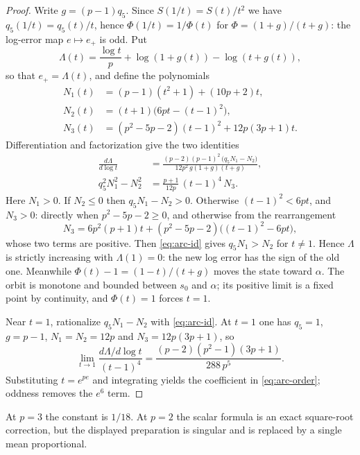 \documentclass[10pt,a4paper]{article}
\theoremstyle{plain}
\theoremstyle{remark}
\numberwithin{equation}{section}
\begin{document}
\begin{proof}
Write $g=(p-1)q_5$. Since $S(1/t)=S(t)/t^{2}$ we have $q_5(1/t)=q_5(t)/t$, hence
$\Phi(1/t)=1/\Phi(t)$ for $\Phi=(1+g)/(t+g)$: the log-error map $e\mapsto e_+$ is odd. Put
\[ \Lambda(t)=\frac{\log t}{p}+\log(1+g(t))-\log(t+g(t)), \]
so that $e_+=\Lambda(t)$, and define the polynomials
\begin{align*}
N_1(t)&=(p-1)(t^{2}+1)+(10p+2)t,\\
N_2(t)&=(t+1)\bigl(6pt-(t-1)^{2}\bigr),\\
N_3(t)&=(p^{2}-5p-2)(t-1)^{2}+12p(3p+1)t .
\end{align*}
Differentiation and factorization give the two identities
\begin{align}
\frac{d\Lambda}{d\log t}&=\frac{(p-2)(p-1)^{2}\,\bigl(q_5N_1-N_2\bigr)}{12p^{2}\,g(1+g)(t+g)},\label{eq:arc-der}\\
q_5^{2}N_1^{2}-N_2^{2}&=\frac{p+1}{12p}\,(t-1)^{4}\,N_3 .\label{eq:arc-id}
\end{align}
Here $N_1>0$. If $N_2\le0$ then $q_5N_1-N_2>0$. Otherwise $(t-1)^{2}<6pt$, and $N_3>0$: directly when
$p^{2}-5p-2\ge0$, and otherwise from the rearrangement
\[ N_3=6p^{2}(p+1)t+(p^{2}-5p-2)\bigl((t-1)^{2}-6pt\bigr), \]
whose two terms are positive. Then \eqref{eq:arc-id} gives $q_5N_1>N_2$ for $t\neq1$. Hence $\Lambda$
is strictly increasing with $\Lambda(1)=0$: the new log error has the sign of the old one. Meanwhile
$\Phi(t)-1=(1-t)/(t+g)$ moves the state toward $\alpha$. The orbit is monotone and bounded between
$s_0$ and $\alpha$; its positive limit is a fixed point by continuity, and $\Phi(t)=1$ forces $t=1$.

Near $t=1$, rationalize $q_5N_1-N_2$ with \eqref{eq:arc-id}. At $t=1$ one has $q_5=1$, $g=p-1$,
$N_1=N_2=12p$ and $N_3=12p(3p+1)$, so
\[ \lim_{t\to1}\frac{d\Lambda/d\log t}{(t-1)^{4}}=\frac{(p-2)(p^{2}-1)(3p+1)}{288\,p^{5}} . \]
Substituting $t=e^{pe}$ and integrating yields the coefficient in \eqref{eq:arc-order}; oddness removes
the $e^{6}$ term.
\end{proof}

At $p=3$ the constant is $1/18$. At $p=2$ the scalar formula is an exact square-root correction, but
the displayed preparation is singular and is replaced by a single mean proportional.




\end{document}
